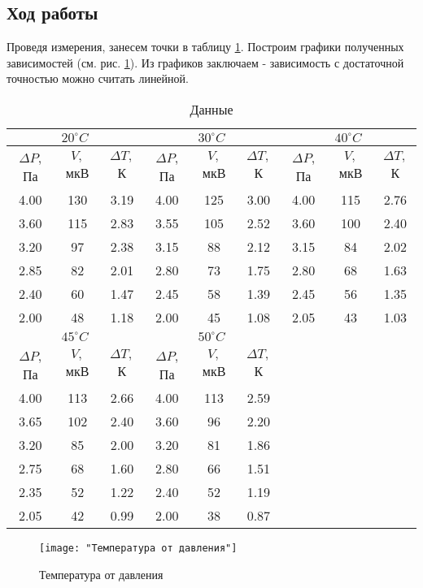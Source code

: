 \documentclass[12pt,a4paper]{article}
\begin{document}
\subsection*{Ход работы}
Проведя измерения, занесем точки в таблицу \ref{dta}. Построим графики полученных зависимостей (см. рис. \ref{fig:pot}). Из графиков заключаем - зависимость с достаточной точностью можно считать линейной. 
\begin{table}
	
	\caption{Данные}
	\label{dta}
	\centering
	\footnotesize
	\begin{tabular}{|c|c|c|c|c|c|c|c|c|}
		\hline
		\multicolumn{3}{|c|}{$20^\circ C$} & \multicolumn{3}{|c|}{$30^\circ C$} & \multicolumn{3}{|c|}{$40^\circ C$} \\ \hline
		$\Delta P$, Па & $V,$ мкВ & $\Delta T,$К & $\Delta P$, Па & $V,$ мкВ & $\Delta T,$К & $\Delta P$, Па & $V,$ мкВ & $\Delta T,$К \\ \hline
		4.00 & 130 & 3.19 & 4.00 & 125 & 3.00 & 4.00 & 115 & 2.76 \\ \hline
		3.60 & 115 & 2.83 & 3.55 & 105 & 2.52 & 3.60 & 100 & 2.40 \\ \hline
		3.20 & 97 & 2.38 & 3.15 & 88 & 2.12 & 3.15 & 84 & 2.02 \\ \hline
		2.85 & 82 & 2.01 & 2.80 & 73 & 1.75 & 2.80 & 68 & 1.63 \\ \hline
		2.40 & 60 & 1.47 & 2.45 & 58 & 1.39 & 2.45 & 56 & 1.35 \\ \hline
		2.00 & 48 & 1.18 & 2.00 & 45 & 1.08 & 2.05 & 43 & 1.03 \\ \hline
		
		\multicolumn{3}{|c|}{$45^\circ C$} & \multicolumn{3}{|c|}{$50^\circ C$} & \multicolumn{3}{|c|}{} \\ \hline
		$\Delta P$, Па & $V,$ мкВ & $\Delta T,$К & $\Delta P$, Па & $V,$ мкВ & $\Delta T,$К &  \multicolumn{3}{|c|}{} \\ \hline
		4.00 & 113 & 2.66 & 4.00 & 113 & 2.59& \multicolumn{3}{|c|}{} \\ \hline
		3.65 & 102 & 2.40 & 3.60 & 96 & 2.20& \multicolumn{3}{|c|}{} \\ \hline
		3.20 & 85 & 2.00 & 3.20 & 81 & 1.86& \multicolumn{3}{|c|}{} \\ \hline
		2.75 & 68 & 1.60 & 2.80 & 66 & 1.51& \multicolumn{3}{|c|}{} \\ \hline
		2.35 & 52 & 1.22 & 2.40 & 52 & 1.19& \multicolumn{3}{|c|}{} \\ \hline
		2.05 & 42 & 0.99 & 2.00 & 38 & 0.87& \multicolumn{3}{|c|}{} \\ \hline
		
	\end{tabular}
	
\end{table}
\begin{figure}
	\centering
	\texttt{[image: "Температура от давления"]}
	\caption{Температура от давления}
	\label{fig:pot}
\end{figure}
\end{document}
